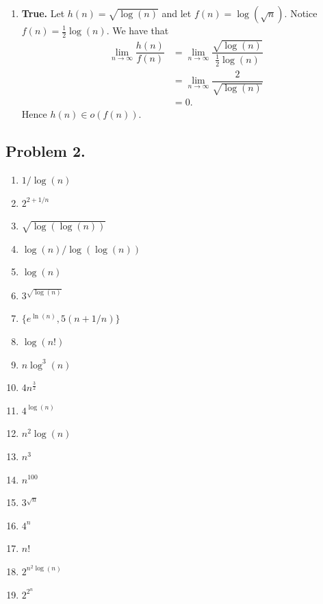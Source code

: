 \documentclass[11pt, letterpaper, titlepage]{article}
\begin{document}
\begin{enumerate}[label=\alph*)]
    \item \textbf{True.} Let $h(n) = \sqrt{\log(n)}$ and let $f(n) = \log(\sqrt{n})$. Notice $f(n) = \frac{1}{2}\log(n)$. We have that 
    \begin{align}
        \lim_{n\to\infty} \dfrac{h(n)}{f(n)} &= \lim_{n\to\infty} \dfrac{ \sqrt{\log(n)} }{ \frac{1}{2}\log(n) } \\
        &= \lim_{n\to\infty} \dfrac{ 2 }{ \sqrt{\log(n)} } \\
        &= 0.
    \end{align}
    Hence $h(n) \in o(f(n))$.
\end{enumerate}

\newpage

\subsection*{Problem 2.}
\begin{enumerate}
    \item $1 / \log(n)$
    \item $2^{2+1/n}$
    \item $\sqrt{\log(\log(n))}$
    \item $\log(n) / \log(\log(n))$
    \item $\log(n)$
    \item $3^{\sqrt{\log(n)}}$
    \item $\{e^{\ln(n)}, 5(n+1/n)\}$
    \item $\log(n!)$
    \item $n \log^3(n)$
    \item $4n^{\frac{3}{2}}$
    \item $4^{\log(n)}$
    \item $n^2 \log(n)$
    \item $n^3$
    \item $n^{100}$
    \item $3^{\sqrt{n}}$
    \item $4^n$
    \item $n!$
    \item $2^{n^2\log(n)}$
    \item $2^{2^n}$
\end{enumerate}

\newpage
\end{document}
